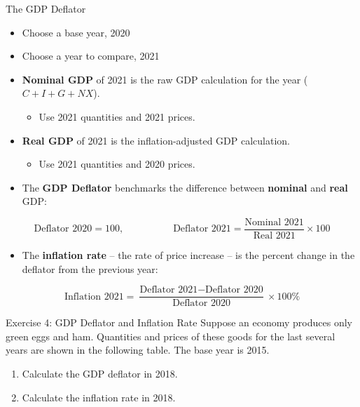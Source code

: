 \documentclass[9pt]{beamer}
\begin{document}
\begin{frame}{The GDP Deflator}
\begin{itemize}
    \item Choose a base year, 2020
    \vspace{3pt}
    \item Choose a year to compare, 2021
    \vspace{3pt}
    \item \textbf{Nominal GDP} of 2021 is the raw GDP calculation for the year ($C+I+G+NX$).
    \vspace{3pt}
    \begin{itemize}
        \item Use 2021 quantities and 2021 prices.
    \end{itemize}
    \vspace{3pt}
    \item \textbf{Real GDP} of 2021 is the inflation-adjusted GDP calculation.
    \vspace{3pt}
    \begin{itemize}
        \item Use 2021 quantities and 2020 prices.
    \end{itemize}
    \vspace{3pt}
    \item The \textbf{GDP Deflator} benchmarks the difference between \textbf{nominal} and \textbf{real} GDP:
    \end{itemize}
    \vspace{10pt}
    \begin{equation*}
        \text{Deflator 2020} = 100, \quad \quad \quad \quad \quad \text{Deflator 2021} = \frac{\text{Nominal 2021}}{\text{Real 2021}} \times 100
    \end{equation*}
    \begin{itemize}
        \item The \textbf{inflation rate} -- the rate of price increase -- is the percent change in the deflator from the previous year:
        \vspace{10pt}
    \end{itemize}
    \[
    \text{Inflation 2021} = \frac{\text{Deflator 2021} - \text{Deflator 2020}}{\text{Deflator 2020}} \times 100\%
    \]
\end{frame}

\begin{frame}{Exercise 4: GDP Deflator and Inflation Rate}
    Suppose an economy produces only green eggs and ham. Quantities and prices of these goods for the last several years are shown in the following table. The base year is 2015.
    
    \begin{enumerate}
        \item Calculate the GDP deflator in 2018.
        \item Calculate the inflation rate in 2018.
    \end{enumerate}   
    \vspace{1in}
\end{frame}
\end{document}
